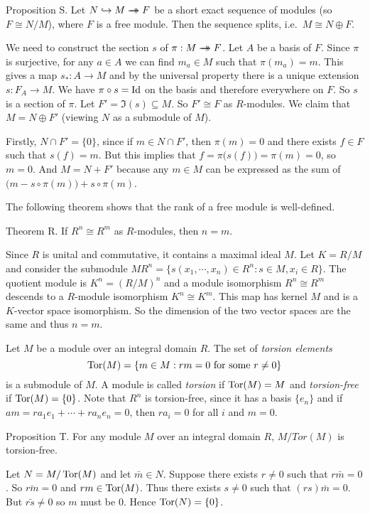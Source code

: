 \proclaim Proposition S. Let $N\hookrightarrow M \rightarrow\!\!\!\!\!\rightarrow F$ be a short exact sequence of modules (so $F \cong N/M$), where $F$ is a free module. Then the sequence splits, i.e.\ $M\cong N\oplus F$.

\proof We need to construct the section $s$ of $\pi : M\rightarrow\!\!\!\!\!\rightarrow F$. Let $A$ be a basis of $F$. Since $\pi$ is surjective, for any $a\in A$ we can find $m_a\in M$ such that $\pi(m_a) = m$. This gives a map $s_* : A \to M$ and by the universal property there is a unique extension $s : F_A\to M$. We have $\pi \circ s = \mathop {\rm Id}$ on the basis and therefore everywhere on $F$. So $s$ is a section of $\pi$. Let $F' = \Im(s) \subseteq M$. So $F'\cong F$ as $R$-modules. We claim that $M = N\oplus F'$ (viewing $N$ as a submodule of $M$).

Firstly, $N\cap F' = \{0\}$, since if $m\in N\cap F'$, then $\pi(m) = 0$ and there exists $f\in F$ such that $s(f) = m$. But this implies that $f = \pi\big(s(f)\big) = \pi(m) = 0$, so $m=0$. And $M = N + F'$ because any $m\in M$ can be expressed as the sum of $\big(m-s\circ \pi(m)\big) + s\circ\pi (m)$.\slug

The following theorem shows that the rank of a free module is well-defined.

\proclaim Theorem R. If $R^n\cong R^m$ as $R$-modules, then $n = m$.

\proof Since $R$ is unital and commutative, it contains a maximal ideal $M$. Let $K = R/M$ and consider the submodule $MR^n = \big\{s(x_1,\cdots,x_n) \in R^n: s\in M, x_i\in R\big\}$. The quotient module is $K^n = (R/M)^n$ and a module isomorphism $R^n \cong R^m$ descends to a $R$-module isomorphism $K^n \cong K^m$. This map has kernel $M$ and is a $K$-vector space isomorphism. So the dimension of the two vector spaces are the same and thus $n=m$.\slug

Let $M$ be a module over an integral domain $R$. The set of {\it torsion elements}
$$\Tor(M) = \{m\in M : rm = 0\ \hbox{for some}\ r\neq 0\}$$
is a submodule of $M$. A module is called {\it torsion} if $\mathop {\rm Tor}(M) = M$ and {\it torsion-free} if $\mathop {\rm Tor}(M) = \{0\}$. Note that $R^n$ is torsion-free, since it has a basis $\{e_n\}$ and if $am = ra_1e_1 + \cdots + ra_ne_n = 0$, then $ra_i = 0$ for all $i$ and $m = 0$.

\proclaim Proposition T. For any module $M$ over an integral domain $R$, $M/Tor(M)$ is torsion-free.

\proof Let $N = M/\mathop {\rm Tor}(M)$ and let $\bar m\in N$. Suppose there exists $r\neq 0$ such that $r\bar m = 0$. So $\bar{rm} = 0$ and $rm \in \mathop {\rm Tor}(M)$. Thus there exists $s\neq 0$ such that $(rs)\bar m = 0$. But $\bar{rs}\neq 0$ so $m$ must be 0. Hence $\mathop {\rm Tor}(N) = \{0\}$.\slug

